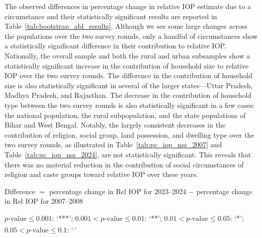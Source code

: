 \documentclass[12pt]{article}
\theoremstyle{plain}
\theoremstyle{definition}
\begin{document}

The observed differences in percentage change in relative IOP estimate due to a circumstance and their statistically significant results are reported in Table~\ref{tab:bootstrap_abl_results}. Although we see some large changes across the populations over the two survey rounds, only a handful of circumstances show a statistically significant difference in their contribution to relative IOP. Nationally, the overall sample and both the rural and urban subsamples show a statistically significant increase in the contribution of household size to relative IOP over the two survey rounds. The difference in the contribution of household size is also statistically significant in several of the larger states---Uttar Pradesh, Madhya Pradesh, and Rajasthan. The decrease in the contribution of household type between the two survey rounds is also statistically significant in a few cases: the national population, the rural subpopulation, and the state populations of Bihar and West Bengal. Notably, the largely consistent decreases in the contribution of religion, social group, land possession, and dwelling type over the two survey rounds, as illustrated in Table~\ref{tab:pc_iop_nss_2007} and Table~\ref{tab:pc_iop_nss_2024}, are not statistically significant. This reveals that there was no material reduction in the contribution of social circumstances of religion and caste groups toward relative IOP over these years.

\begin{table}[htbp]
    \centering
    \begin{threeparttable}
    \caption{Test for Significant Difference Between Ablation Results for NSS 2007--2008 and NSS 2023--2024}
    \label{tab:bootstrap_abl_results}
    {\small
    }
    \begin{tablenotes}
        \footnotesize
        \item[1] Difference $=$ percentage change in Rel IOP for 2023--2024 $-$ percentage change in Rel IOP for 2007--2008
        \item[2] 
        $p\text{-value} \leq 0.001$: `***';\;
        $0.001 < p\text{-value} \leq 0.01$: `**';\;
        $0.01 < p\text{-value} \leq 0.05$: `*';\
        $0.05 < p\text{-value} \leq 0.1$: `\textsuperscript{.}'
    \end{tablenotes}
    \end{threeparttable}
\end{table}
\end{document}
